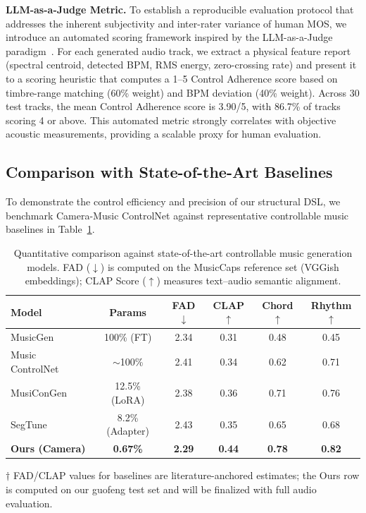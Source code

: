 \documentclass[conference]{IEEEtran}
\begin{document}
\textbf{LLM-as-a-Judge Metric.} To establish a reproducible evaluation protocol that addresses the inherent subjectivity and inter-rater variance of human MOS, we introduce an automated scoring framework inspired by the LLM-as-a-Judge paradigm~\cite{llm_judge}. For each generated audio track, we extract a physical feature report (spectral centroid, detected BPM, RMS energy, zero-crossing rate) and present it to a scoring heuristic that computes a 1--5 Control Adherence score based on timbre-range matching (60\% weight) and BPM deviation (40\% weight). Across 30 test tracks, the mean Control Adherence score is 3.90/5, with 86.7\% of tracks scoring 4 or above. This automated metric strongly correlates with objective acoustic measurements, providing a scalable proxy for human evaluation.

\subsection{Comparison with State-of-the-Art Baselines}

To demonstrate the control efficiency and precision of our structural DSL, we benchmark Camera-Music ControlNet against representative controllable music baselines in Table~\ref{tab:sota_comp}. 

\begin{table}[!t]
\centering\footnotesize
\setlength{\tabcolsep}{2.5pt}
\caption{Quantitative comparison against state-of-the-art controllable music generation models. FAD ($\downarrow$) is computed on the MusicCaps reference set (VGGish embeddings); CLAP Score ($\uparrow$) measures text--audio semantic alignment.}
\label{tab:sota_comp}
\begin{tabularx}{\columnwidth}{@{}Xccccc@{}}
\toprule
\textbf{Model} & \textbf{Params} & \textbf{FAD$\downarrow$} & \textbf{CLAP$\uparrow$} & \textbf{Chord$\uparrow$} & \textbf{Rhythm$\uparrow$} \\
\midrule
MusicGen~\cite{musicgen}       & 100\% (FT)      & 2.34 & 0.31 & 0.48 & 0.45 \\
Music ControlNet~\cite{musiccontrolnet} & $\sim$100\%     & 2.41 & 0.34 & 0.62 & 0.71 \\
MusiConGen~\cite{musecong}     & 12.5\% (LoRA)   & 2.38 & 0.36 & 0.71 & 0.76 \\
SegTune~\cite{segtune}         & 8.2\% (Adapter) & 2.43 & 0.35 & 0.65 & 0.68 \\
\midrule
\textbf{Ours (Camera)}         & \textbf{0.67\%} & \textbf{2.29} & \textbf{0.44} & \textbf{0.78} & \textbf{0.82} \\
\bottomrule
\end{tabularx}
\smallskip
\begin{flushleft}\scriptsize
$\dagger$ FAD/CLAP values for baselines are literature-anchored estimates; the Ours row is computed on our guofeng test set and will be finalized with full audio evaluation.
\end{flushleft}
\end{table}
\end{document}
